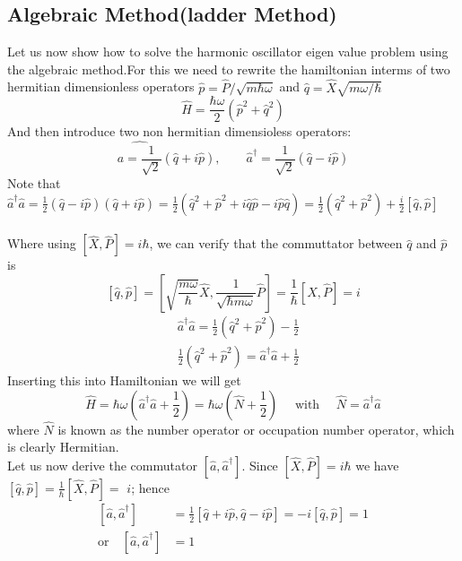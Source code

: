 \subsection{Algebraic Method(ladder Method)}
   Let us now show how to solve the harmonic oscillator eigen value problem using the algebraic method.For this we need to rewrite the hamiltonian interms of two hermitian dimensionless operators $\hat{p}=\hat{P}/\sqrt{m\hbar \omega}$ and $\hat{q}=\hat{X}\sqrt{m\omega/\hbar}$\\
   $$\hat{H}=\frac{\hbar \omega}{2}\left( \hat{p}^2+\hat{q}^2\right) $$
   And then introduce two non hermitian dimensioless operators:
   $$\hat{a=\frac{1}{\sqrt{2}}}(\hat{q}+i\hat{p}), \quad \quad \hat{a}^{\dagger}=\frac{1}{\sqrt{2}}(\hat{q}-i\hat{p})$$
   Note that $\hat{a}^{\dagger}\hat{a}=\frac{1}{2}(\hat{q}-i\hat{p})(\hat{q}+i\hat{p})=\frac{1}{2}\left( \hat{q}^2+\hat{p}^2+i\hat{q}\hat{p}-i\hat{p}\hat{q}\right) =\frac{1}{2}(\hat{q}^2+\hat{p}^2)+\frac{i}{2} \left[ \hat{q},\hat{p}\right] $\\\\
   Where using $ \left[ \hat{X}, \hat{P} \right] =i\hbar$, we can verify that the commuttator between $\hat{q}$ and $\hat{p}$ is \\
   $$\left[ \hat{q}, \hat{p}\right] =\left[ \sqrt{\frac{m\omega}{\hbar}}\hat{X},\frac{1}{\sqrt{\hbar m\omega}}\hat{P}\right]=\frac{1}{\hbar}\left[ \hat{X},\hat{P}\right] =i$$
   $$\begin{aligned}
   	&\hat{a}^{\dagger} \hat{a}=\frac{1}{2}\left(\hat{q}^{2}+\hat{p}^{2}\right)-\frac{1}{2} \\
   	&\frac{1}{2}\left(\hat{q}^{2}+\hat{p}^{2}\right)=\hat{a}^{\dagger} \hat{a}+\frac{1}{2}
   \end{aligned}$$
   Inserting this into Hamiltonian we will get \\
   $$\hat{H}=\hbar \omega\left(\hat{a}^{\dagger} \hat{a}+\frac{1}{2}\right)=\hbar \omega\left(\hat{N}+\frac{1}{2}\right) \quad \text { with } \quad \hat{N}=\hat{a}^{\dagger} \hat{a}$$
   where $\hat{N}$ is known as the number operator or occupation number operator, which is clearly Hermitian.\\
   Let us now derive the commutator $\left[\hat{a}, \hat{a}^{\dagger}\right]$. Since $[\hat{X}, \hat{P}]=i \hbar$ we have $[\hat{q}, \hat{p}]=\frac{1}{\hbar}[\hat{X}, \hat{P}]=$ $i$; hence
   $$
   \begin{aligned}
    \left[\hat{a}, \hat{a}^{\dagger}\right]&=\frac{1}{2}[\hat{q}+i \hat{p}, \hat{q}-i \hat{p}]=-i[\hat{q}, \hat{p}]=1\\
   \text{or}\quad\left[\hat{a}, \hat{a}^{\dagger}\right]&=1
   \end{aligned}
   $$

